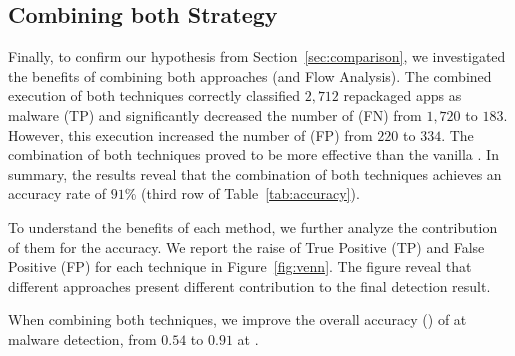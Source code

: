 \begin{table}[h]
  \caption{Accuracy of both strategy on \cds.}
  \label{tab:accuracy}
\end{table}


\subsection{Combining both Strategy}\label{sec:strategy}

Finally, to confirm our hypothesis from Section~\ref{sec:comparison}, we investigated the benefits of combining both approaches (\mas and Flow Analysis). The combined execution of both techniques correctly classified $2,712$ repackaged apps as malware (TP) and significantly decreased the number of (FN) from $1,720$ to $183$. However, this execution increased the number of (FP) from $220$ to $334$. The combination of both techniques proved to be more effective than the vanilla \mas. In summary, the results reveal that the combination of both techniques achieves an accuracy rate of $91$\% (third row of Table~\ref{tab:accuracy}).

To understand the benefits of each method, we further analyze the contribution of them for the accuracy. We report the raise of True Positive (TP) and False Positive (FP) for each technique in Figure~\ref{fig:venn}. The figure reveal that different approaches present different contribution to the final detection result.

\begin{finding}
When combining both techniques, we improve the overall accuracy (\fone) of \mas at malware detection, from $0.54$ to $0.91$ at \cds.
\end{finding}

